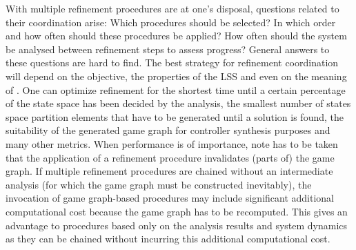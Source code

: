 With multiple refinement procedures are at one's disposal, questions related to their coordination arise:
Which procedures should be selected?
In which order and how often should these procedures be applied?
How often should the system be analysed between refinement steps to assess progress?
General answers to these questions are hard to find.
The best strategy for refinement coordination will depend on the objective, the properties of the LSS and even on the meaning of .
One can optimize refinement for the shortest time until a certain percentage of the state space has been decided by the analysis, the smallest number of states space partition elements that have to be generated until a solution is found, the suitability of the generated game graph for controller synthesis purposes and many other metrics.
When performance is of importance, note has to be taken that the application of a refinement procedure invalidates (parts of) the game graph.
If multiple refinement procedures are chained without an intermediate analysis (for which the game graph must be constructed inevitably), the invocation of game graph-based procedures may include significant additional computational cost because the game graph has to be recomputed.
This gives an advantage to procedures based only on the analysis results and system dynamics as they can be chained without incurring this additional computational cost.

